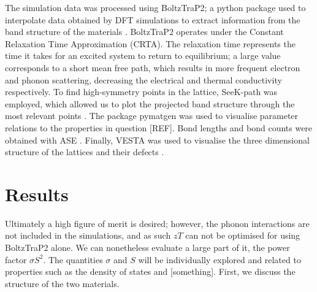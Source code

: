 \documentclass[12pt]{article}
\theoremstyle{plain}
\theoremstyle{definition}
\newcommand{\<}{\langle}
\renewcommand{\>}{\rangle}
\begin{document}
The simulation data was processed using BoltzTraP2; a python package used to interpolate data obtained by DFT simulations to extract information from the band structure of the materials \cite{MadsenGeorgK.H.2018Bapf}. 
BoltzTraP2 operates under the Constant Relaxation Time Approximation (CRTA). The relaxation time represents the time it takes for an excited system to return to equilibrium; a large value corresponds to a short mean free path, which results in more frequent electron and phonon scattering, decreasing the electrical and thermal conductivity respectively. 
To find high-symmetry points in the lattice, SeeK-path was employed, which allowed us to plot the projected band structure through the most relevant points \cite{HINUMA2017140, togo, HjorthLarsen_2017, qe-tools, ONG2013314}. The package pymatgen was used to visualise parameter relations to the properties in question [REF]. 
Bond lengths and bond counts were obtained with ASE \cite{ase-paper, ISI:000175131400009}.
Finally, VESTA was used to visualise the three dimensional structure of the lattices and their defects \cite{Momma:ko5060, Momma:db5098}.

\clearpage

\section{Results}

Ultimately a high figure of merit is desired; however, the phonon interactions are not included in the simulations, and as such $zT$ can not be optimised for using BoltzTraP2 alone.
We can nonetheless evaluate a large part of it, the power factor $\sigma S^2$. 
The quantities $\sigma$ and $S$ will be individually explored and related to properties such as the density of states and [something]. First, we discuss the structure of the two materials.
\end{document}

